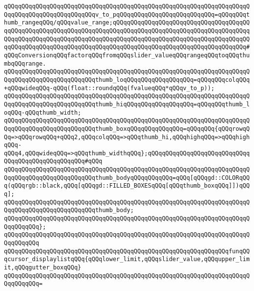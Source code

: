 \verb|qQQqqQQqqQQqqQQqqQQqqQQqqQQqqQQqqQQqqQQqqQQqqQQqqQQqqQQqqQQqqQQqqQQqqQQqqQQqqQQqqQQqqQQqqQQqqQQqv_to_pqQQqqQQqqQQqqQQqqQQqqQQqqQQq=qQQqqQQqthumb_rangeqQQq/qQQqvalue_range;qQQqqQQqqQQqqQQqqQQqqQQqqQQqqQQqqQQqqQQqqQQqqQQqqQQqqQQqqQQqqQQqqQQqqQQqqQQqqQQqqQQqqQQqqQQqqQQqqQQqqQQqqQQqqQQqqQQqqQQqqQQqqQQqqQQqqQQqqQQqqQQqqQQqqQQqqQQqqQQqqQQqqQQqqQQqqQQqqQQqqQQqqQQqqQQqqQQqqQQqqQQqqQQqqQQqqQQqqQQqqQQqqQQqqQQqqQQqqQQqqQQqqQQq#qQQqConversionqQQqfactorqQQqfromqQQqslider_valueqQQqrangeqQQqtoqQQqthumbqQQqrange.|\newline
\verb|qQQqqQQqqQQqqQQqqQQqqQQqqQQqqQQqqQQqqQQqqQQqqQQqqQQqqQQqqQQqqQQqqQQqqQQqqQQqqQQqqQQqqQQqqQQqqQQqthumb_loqQQqqQQqqQQqqQQqqQQq=qQQqqQQqcolqQQq+qQQqwideqQQq-qQQq(float::roundqQQq(fvalueqQQq*qQQqv_to_p));|\newline
\verb|qQQqqQQqqQQqqQQqqQQqqQQqqQQqqQQqqQQqqQQqqQQqqQQqqQQqqQQqqQQqqQQqqQQqqQQqqQQqqQQqqQQqqQQqqQQqqQQqthumb_hiqQQqqQQqqQQqqQQqqQQq=qQQqqQQqthumb_loqQQq-qQQqthumb_width;|\newline
\newline
\verb|qQQqqQQqqQQqqQQqqQQqqQQqqQQqqQQqqQQqqQQqqQQqqQQqqQQqqQQqqQQqqQQqqQQqqQQqqQQqqQQqqQQqqQQqqQQqqQQqthumb_boxqQQqqQQqqQQqqQQq=qQQqqQQq{qQQqrowqQQq=>qQQqrowqQQq+qQQq2,qQQqcolqQQq=>qQQqthumb_hi,qQQqhighqQQq=>qQQqhighqQQq-qQQq4,qQQqwideqQQq=>qQQqthumb_widthqQQq};qQQqqQQqqQQqqQQqqQQqqQQqqQQqqQQqqQQqqQQqqQQqqQQqqQQq#qQQq|\newline
\newline
\verb|qQQqqQQqqQQqqQQqqQQqqQQqqQQqqQQqqQQqqQQqqQQqqQQqqQQqqQQqqQQqqQQqqQQqqQQqqQQqqQQqqQQqqQQqqQQqqQQqthumb_bodyqQQqqQQqqQQq=qQQq[qQQqgd::COLORqQQq(qQQqrgb::black,qQQq[qQQqgd::FILLED_BOXESqQQq[qQQqthumb_boxqQQq]])qQQq];|\newline
\newline
\verb|qQQqqQQqqQQqqQQqqQQqqQQqqQQqqQQqqQQqqQQqqQQqqQQqqQQqqQQqqQQqqQQqqQQqqQQqqQQqqQQqqQQqqQQqqQQqqQQqthumb_body;|\newline
\verb|qQQqqQQqqQQqqQQqqQQqqQQqqQQqqQQqqQQqqQQqqQQqqQQqqQQqqQQqqQQqqQQqqQQqqQQqqQQqqQQq};|\newline
\verb|qQQqqQQqqQQqqQQqqQQqqQQqqQQqqQQqqQQqqQQqqQQqqQQqqQQqqQQqqQQqqQQqqQQqqQQqqQQqqQQq|\newline
\verb|qQQqqQQqqQQqqQQqqQQqqQQqqQQqqQQqqQQqqQQqqQQqqQQqqQQqqQQqqQQqqQQqfunqQQqcursor_displaylistqQQq{qQQqlower_limit,qQQqslider_value,qQQqupper_limit,qQQqgutter_boxqQQq}|\newline
\verb|qQQqqQQqqQQqqQQqqQQqqQQqqQQqqQQqqQQqqQQqqQQqqQQqqQQqqQQqqQQqqQQqqQQqqQQqqQQqqQQq=|\newline
